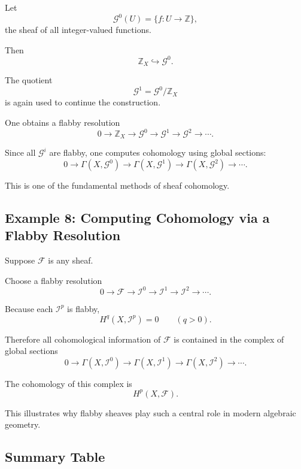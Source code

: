 \documentclass[12pt,a4paper]{article}
\theoremstyle{notespace}
\begin{document}
Let
\[
\mathcal G^0(U)
=
\{f:U\to\mathbb Z\},
\]
the sheaf of all integer-valued functions.

Then
\[
\mathbb Z_X
\hookrightarrow
\mathcal G^0.
\]

The quotient
\[
\mathcal G^1
=
\mathcal G^0/\mathbb Z_X
\]
is again used to continue the construction.

One obtains a flabby resolution
\[
0
\longrightarrow
\mathbb Z_X
\longrightarrow
\mathcal G^0
\longrightarrow
\mathcal G^1
\longrightarrow
\mathcal G^2
\longrightarrow
\cdots.
\]

Since all $\mathcal G^i$ are flabby, one computes cohomology using global
sections:
\[
0
\longrightarrow
\Gamma(X,\mathcal G^0)
\longrightarrow
\Gamma(X,\mathcal G^1)
\longrightarrow
\Gamma(X,\mathcal G^2)
\longrightarrow
\cdots.
\]

This is one of the fundamental methods of sheaf cohomology.

\subsection{Example 8: Computing Cohomology via a Flabby Resolution}

Suppose $\mathcal F$ is any sheaf.

Choose a flabby resolution
\[
0
\longrightarrow
\mathcal F
\longrightarrow
\mathcal I^0
\longrightarrow
\mathcal I^1
\longrightarrow
\mathcal I^2
\longrightarrow
\cdots.
\]

Because each $\mathcal I^p$ is flabby,
\[
H^q(X,\mathcal I^p)=0
\qquad(q>0).
\]

Therefore all cohomological information of $\mathcal F$ is contained in the
complex of global sections
\[
0
\longrightarrow
\Gamma(X,\mathcal I^0)
\longrightarrow
\Gamma(X,\mathcal I^1)
\longrightarrow
\Gamma(X,\mathcal I^2)
\longrightarrow
\cdots.
\]

The cohomology of this complex is
\[
H^p(X,\mathcal F).
\]

This illustrates why flabby sheaves play such a central role in modern
algebraic geometry.

\subsection{Summary Table}
\end{document}
